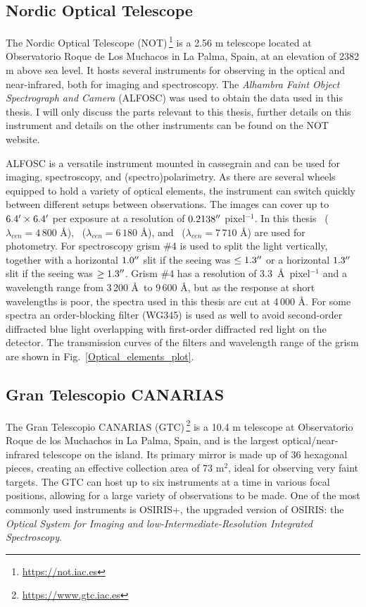 \documentclass[a4paper,oneside,12pt, class=Latex/Classes/PhDthesisPSnPDF, crop=false]{standalone}
\begin{document}
\subsection{Nordic Optical Telescope}
\label{NOT}
The Nordic Optical Telescope (NOT)\,\footnote{\url{https://not.iac.es}} is a 2.56 m telescope located at Observatorio Roque de Los Muchacos in La Palma, Spain, at an elevation of 2382 m above sea level. It hosts several instruments for observing in the optical and near-infrared, both for imaging and spectroscopy. The \textit{Alhambra Faint Object Spectrograph and Camera} (ALFOSC) was used to obtain the data used in this thesis. I will only discuss the parts relevant to this thesis, further details on this instrument and details on the other instruments can be found on the NOT website.

ALFOSC is a versatile instrument mounted in cassegrain and can be used for imaging, spectroscopy, and (spectro)polarimetry. As there are several wheels equipped to hold a variety of optical elements, the instrument can switch quickly between different setups between observations. The images can cover up to $6.4^{\prime}\times6.4^{\prime}$ per exposure at a resolution of $0.2138^{\prime\prime}$ pixel$^{-1}$. In this thesis \ztfg~($\lambda_{cen} = 4\,800$ \AA), \ztfr~($\lambda_{cen} = 6\,180$ \AA), and \ztfi~($\lambda_{cen} = 7\,710$ \AA) are used for photometry. For spectroscopy grism \#4 is used to split the light vertically, together with a horizontal $1.0^{\prime\prime}$ slit if the seeing was $\leq1.3^{\prime\prime}$ or a horizontal $1.3^{\prime\prime}$ slit if the seeing was $\geq1.3^{\prime\prime}$. Grism \#4 has a resolution of 3.3~\AA~pixel$^{-1}$ and a wavelength range from 3\,200 \AA\ to 9\,600 \AA, but as the response at short wavelengths is poor, the spectra used in this thesis are cut at 4\,000 \AA. For some spectra an order-blocking filter (WG345) is used as well to avoid second-order diffracted blue light overlapping with first-order diffracted red light on the detector. The transmission curves of the filters and wavelength range of the grism are shown in Fig.~\ref{Optical_elements_plot}.


\subsection{Gran Telescopio CANARIAS}
\label{GTC}
The Gran Telescopio CANARIAS (GTC)\,\footnote{\url{https://www.gtc.iac.es}} is a 10.4 m telescope at Observatorio Roque de los Muchachos in La Palma, Spain, and is the largest optical/near-infrared telescope on the island. Its primary mirror is made up of 36 hexagonal pieces, creating an effective collection area of 73 m$^2$, ideal for observing very faint targets. The GTC can host up to six instruments at a time in various focal positions, allowing for a large variety of observations to be made. One of the most commonly used instruments is OSIRIS+, the upgraded version of OSIRIS: the \textit{Optical System for Imaging and low-Intermediate-Resolution Integrated Spectroscopy}.
\end{document}
